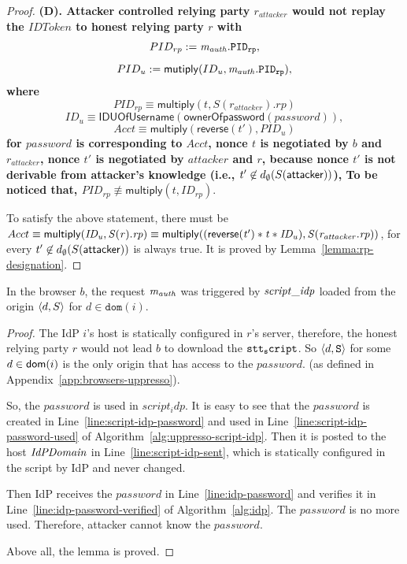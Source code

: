 \begin{proof}
  
  \textbf{(D). Attacker controlled relying party $r_{attacker}$ would not replay the $IDToken$ to honest relying party $r$ with 
  $$PID_{rp} := \mathit{m_{auth}}.\mathtt{PID_{rp}} , $$
  $$PID_u := \mathsf{mutiply}(ID_u, \mathit{m_{auth}.\mathtt{PID_{rp}}}),$$
  where
  $$PID_{rp} \equiv \mathsf{multiply}(t, S(r_{attacker}).rp)$$
  $$ID_u \equiv \mathsf{IDUOfUsername} (\mathsf{ownerOfpassword}(password)),$$
  $$Acct \equiv \mathsf{multiply}(\mathsf{reverse}(t'), PID_u)$$
  for $password$ is corresponding to $Acct$, nonce $t$ is negotiated by $b$ and $r_{attacker}$, nonce $t'$ is negotiated by $attacker$ and $r$, because nonce $t'$ is not derivable from attacker's knowledge (i.e., $t' \not \in  d_{\emptyset}(S(\mathsf{attacker}))$),
  To be noticed that, $PID_{rp} \not\equiv \mathsf{multiply}(t, ID_{rp})$}.  
  
  To satisfy the above statement, there must be $Acct \equiv \mathsf{multiply}(\mathit{ID_u, S(r).rp}) \equiv \mathsf{multiply}(\mathit{(\mathsf{reverse}(\mathit{t'})*t*ID_u), S(r_{attacker}.rp)})$, for every $t' \not \in d_{\emptyset}(S(\mathsf{attacker}))$ is always true. It is proved by Lemma~\ref{lemma:rp-designation}.
  
  
  
  

  \end{proof}
  
  \begin{lemma}\label{lemma:script-idp-trigger-request} %
    In the browser $b$, the request $\mathit{m_{auth}}$ was triggered by $\mathit{script\_idp}$ loaded from the origin $\langle {{}d, S} \rangle$ for $d \in \mathtt{dom}(i)$.
  \end{lemma}
  \begin{proof}
	The IdP $i$'s host is statically configured in $r$'s server, therefore, the honest relying party $r$ would not lead $b$ to download the $\mathtt{stt_script}$.  So $\langle d,\mathtt{S}\rangle$ for some $d \in \mathsf{dom}(i)$ is the only origin that has access to the $password$. (as defined in Appendix~\ref{app:browsers-uppresso}).
	
  So, the $password$ is used in $script_idp$. It is easy to see that the $password$ is created in Line~\ref{line:script-idp-password} and used in Line~\ref{line:script-idp-password-used} of Algorithm~\ref{alg:uppresso-script-idp}. Then it is posted to the host $\mathit{IdPDomain}$ in Line~\ref{line:script-idp-sent}, which is statically configured in the script by IdP and never changed. 
  
  Then IdP receives the $password$ in Line~\ref{line:idp-password} and verifies it in Line~\ref{line:idp-password-verified} of Algorithm~\ref{alg:idp}. The $password$ is no more used. Therefore, attacker cannot know the $password$.
  
  Above all, the lemma is proved.
  \end{proof}


